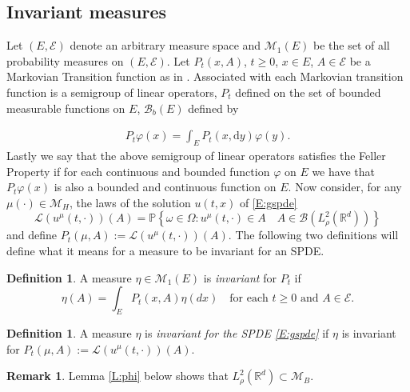 \documentclass[a4paper,11pt]{article}%
\numberwithin{equation}{section}
\theoremstyle{plain}
\theoremstyle{definition}
\newtheorem{definition}[theorem]{Definition}
\newtheorem{remark}[theorem]{Remark}
\newcommand{\R}{\mathbb{R}}
\newcommand{\ud}{\ensuremath{ \mathrm{d} }}
\begin{document}
\subsection{Invariant measures}
Let $(E, \mathscr E)$ denote an arbitrary measure space and $\mathcal M_1(E)$ be the set of all probability measures on $(E, \mathscr E)$. Let $P_t(x,A)$, $t\ge0$, $x\in E$, $A \in \mathscr E$ be a Markovian Transition function as in \cite{DZ96}. Associated with each Markovian transition function is a semigroup of linear operators, $P_t$ defined on the set of bounded measurable functions on $E$, $\mathcal B_b(E)$ defined by

\begin{align*}
	P_t \varphi (x) = \int_E P_t(x,\ud y)\varphi(y).
\end{align*}
Lastly we say that the above semigroup of linear operators satisfies the Feller Property if for each continuous and bounded function $\varphi$ on $E$ we have that $P_t\varphi (x)$ is also a bounded and continuous function on $E$. Now consider, for any $\mu(\cdot) \in \mathcal{M}_H$, the laws of the solution $u(t,x)$ of \eqref{E:gspde}
\begin{equation*}
	\mathscr L (u^\mu(t,\cdot))(A) = \mathbb{P}\left\{\omega \in \Omega : u^\mu\left(t,\cdot\right) \in A \quad A \in \mathscr B(L^2_\rho(\R^d))\right\}
\end{equation*}
and define $P_t(\mu,A) := \mathscr L (u^\mu(t,\cdot))(A)$. The following two definitions will define what it means for a measure to be invariant for an SPDE.

\begin{definition}
A measure $\eta \in \mathcal M_1(E)$ is \textit{invariant} for $P_t$ if
\begin{equation*}
	\eta(A)=\int_E P_t(x,A)\eta(dx) \quad \text{for each $t\ge 0$ and $A \in \mathcal{E}$}.
\end{equation*}
\end{definition}

\begin{definition}
	A measure $\eta$ is \textit{invariant for the SPDE \eqref{E:gspde}} if $\eta$ is invariant for $P_t(\mu,A) := \mathscr L (u^\mu(t,\cdot))(A)$.
\end{definition}

\begin{remark}
	Lemma \ref{L:phi} below shows that $L^2_{\rho}(\R^d) \subset \mathcal{M}_B$.
\end{remark}
\end{document}
